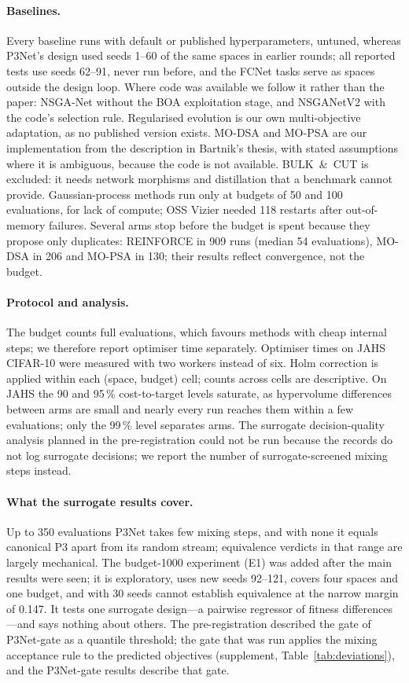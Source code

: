 \paragraph{Baselines.} Every baseline runs with default or published hyperparameters, untuned, whereas P3Net's design
used seeds 1--60 of the same spaces in earlier rounds; all reported tests use seeds 62--91, never run before, and the
FCNet tasks serve as spaces outside the design loop. Where code was available we follow it rather than the paper: NSGA-Net without the BOA exploitation stage, and
NSGANetV2 with the code's selection rule. Regularised evolution is our own multi-objective adaptation, as no
published version exists. MO-DSA and MO-PSA are our implementation from the description in Bartnik's thesis, with
stated assumptions where it is ambiguous, because the code is not available. BULK~\&~CUT is excluded: it needs
network morphisms and distillation that a benchmark cannot provide. Gaussian-process methods run only at budgets of
50 and 100 evaluations, for lack of compute; OSS Vizier needed 118 restarts after out-of-memory failures. Several arms
stop before the budget is spent because they propose only duplicates: REINFORCE in 909 runs (median 54
evaluations), MO-DSA in 206 and MO-PSA in 130; their results reflect convergence, not the budget.

\paragraph{Protocol and analysis.} The budget counts full evaluations, which favours methods with cheap internal
steps; we therefore report optimiser time separately. Optimiser times on JAHS CIFAR-10 were measured with two
workers instead of six. Holm correction is applied within each (space, budget) cell; counts across cells are
descriptive. On JAHS the 90 and 95\,\% cost-to-target levels saturate, as hypervolume differences between arms are small
and nearly every run reaches them within a few evaluations; only the 99\,\% level separates arms. The surrogate decision-quality analysis planned in the pre-registration could not be run because the
records do not log surrogate decisions; we report the number of surrogate-screened mixing steps instead.

\paragraph{What the surrogate results cover.} Up to 350 evaluations P3Net takes few mixing steps, and with none it
equals canonical P3 apart from its random stream; equivalence verdicts in that range are largely mechanical. The
budget-1000 experiment (E1) was added after the main results were seen; it is exploratory, uses new seeds 92--121,
covers four spaces and one budget, and with 30 seeds cannot establish equivalence at the narrow margin of 0.147. It
tests one surrogate design---a pairwise regressor of fitness differences---and says nothing about others. The
pre-registration described the gate of P3Net-gate as a quantile threshold; the gate that was run applies the mixing
acceptance rule to the predicted objectives (supplement, Table~\ref{tab:deviations}), and the P3Net-gate results
describe that gate.
